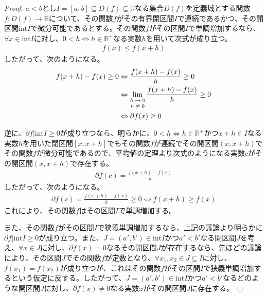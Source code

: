 \documentclass[dvipdfmx]{jsarticle}
\begin{document}
\begin{proof}
$a < b$とし$I = [ a,b] \subseteq D(f) \subseteq \mathbb{R}$なる集合$D(f)$を定義域とする関数$f:D(f) \rightarrow \mathbb{R}$について、その関数$f$がその有界閉区間$I$で連続であるかつ、その開区間$\mathrm{int}I$で微分可能であるとする。その関数$f$がその区間$I$で単調増加するなら、$\forall x \in \mathrm{int}I$に対し、$0 < h \Leftrightarrow h \in \mathbb{R}^{+}$なる実数$h$を用いて次式が成り立つ。
\begin{align*}
f(x) \leq f(x + h)
\end{align*}
したがって、次のようになる。
\begin{align*}
f(x + h) - f(x) \geq 0 &\Leftrightarrow \frac{f(x + h) - f(x)}{h} \geq 0\\
&\Leftrightarrow \lim_{\scriptsize \begin{matrix}
h \rightarrow 0 \\
h \neq 0 \\
\end{matrix}}\frac{f(x + h) - f(x)}{h} \geq 0\\
&\Leftrightarrow \partial f(x) \geq 0
\end{align*}\par
逆に、$\partial f|\mathrm{int}I \geq 0$が成り立つなら、明らかに、$0 < h \Leftrightarrow h \in \mathbb{R}^{+}$かつ$x + h \in I$なる実数$h$を用いた閉区間$[ x,x + h]$でもその関数$f$が連続でその開区間$(x,x + h)$でその関数$f$が微分可能であるので、平均値の定理より次式のようになる実数$c$がその開区間$(x,x + h)$で存在する。
\begin{align*}
\partial f(c) = \frac{f(x + h) - f(x)}{h}
\end{align*}
したがって、次のようになる。
\begin{align*}
\partial f(c) = \frac{f(x + h) - f(x)}{h} \geq 0 \Leftrightarrow f(x + h) \geq f(x)
\end{align*}
これにより、その関数$f$はその区間$I$で単調増加する。\par
また、その関数$f$がその区間$I$で狭義単調増加するなら、上記の議論より明らかに$\partial f|\mathrm{int}I \geq 0$が成り立つ。また、$J = \left( a',b' \right) \in \mathrm{int}I$かつ$a' < b'$なる開区間$J$を考え、$\forall x \in J$に対し、$\partial f(x) = 0$なるその開区間$J$が存在するなら、先ほどの議論により、その区間$J$でその関数$f$が定数となり、$\forall x_{1},x_{2} \in J \subseteq I$に対し、$f\left( x_{1} \right) = f\left( x_{2} \right)$が成り立つが、これはその関数$f$がその区間$I$で狭義単調増加するという仮定に反する。したがって、$J = \left( a',b' \right) \in \mathrm{int}I$かつ$a' < b'$なるどのような開区間$J$に対し、$\partial f(x) \neq 0$なる実数$x$がその開区間$J$に存在する。\par

\end{proof}
\end{document}
